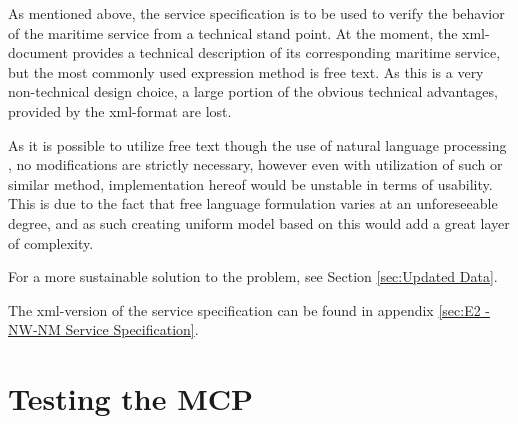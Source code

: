 As mentioned above, the service specification is to be used to verify the behavior of the maritime service from a technical stand point. At the moment, the xml-document provides a technical description of its corresponding maritime service, but the most commonly used expression method is free text. As this is a very non-technical design choice, a large portion of the obvious technical advantages, provided by the xml-format are lost. 

As it is possible to utilize free text though the use of natural language processing \cite{nlp}, no modifications are strictly necessary, however even with utilization of such or similar method, implementation hereof would be unstable in terms of usability. This is due to the fact that free language formulation varies at an unforeseeable degree, and as such creating uniform model based on this would add a great layer of complexity.

For a more sustainable solution to the problem, see Section \ref{sec:Updated Data}.

The xml-version of the service specification can be found in appendix \ref{sec:E2 - NW-NM Service Specification}.

\section{Testing the MCP}

